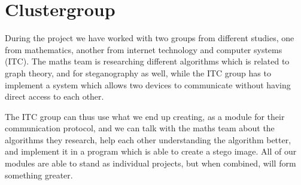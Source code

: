 \section*{Clustergroup}
During the project we have worked with two groups from different studies, one from mathematics, another from internet technology and computer systems (ITC). 
The maths team is researching different algorithms which is related to graph theory, and for steganography as well, while the ITC group has to implement a system which allows two devices to communicate without having direct access to each other.

The ITC group can thus use what we end up creating, as a module for their communication protocol, and we can talk with the maths team about the algorithms they research, help each other understanding the algorithm better, and implement it in a program which is able to create a stego image. 
All of our modules are able to stand as individual projects, but when combined, will form something greater.